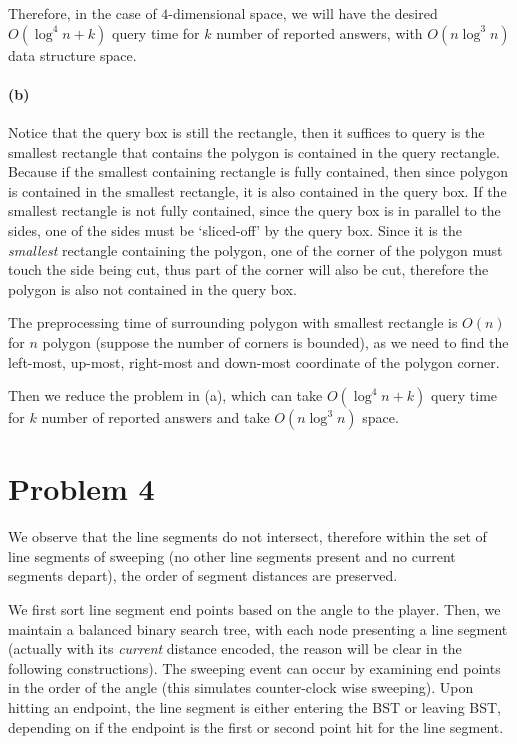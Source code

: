 \documentclass[12pt]{article}
\begin{document}
Therefore, in the case of $4$-dimensional space, we will have the desired $O(\log ^4 n + k)$ query time for $k$ number of reported answers, with $O(n \log^3 n)$ data structure space.




\paragraph{(b)} Notice that the query box is still the rectangle, then it suffices to query is the smallest rectangle that contains the polygon is contained in the query rectangle. Because if the smallest containing rectangle is fully contained, then since polygon is contained in the smallest rectangle, it is also contained in the query box. If the smallest rectangle is not fully contained, since the query box is in parallel to the sides, one of the sides must be `sliced-off' by the query box. Since it is the \emph{smallest} rectangle containing the polygon, one of the corner of the polygon must touch the side being cut, thus part of the corner will also be cut, therefore the polygon is also not contained in the query box.

The preprocessing time of surrounding polygon with smallest rectangle is $O(n)$ for $n$ polygon (suppose the number of corners is bounded), as we need to find the left-most, up-most, right-most and down-most coordinate of the polygon corner. 

Then we reduce the problem in (a), which can take $O(\log ^4 n + k)$ query time for  $k$ number of reported answers and take $O(n \log^3 n)$ space.

\pagebreak
\section*{Problem 4}
We observe that the line segments do not intersect, therefore within the set of line segments of sweeping (no other line segments present and no current segments depart), the order of segment distances are preserved. 

We first sort line segment end points based on the angle to the player. Then, we maintain a balanced binary search tree, with each node presenting a line segment (actually with its \emph{current} distance encoded, the reason will be clear in the following constructions). The sweeping event can occur by examining end points in the order of the angle (this simulates counter-clock wise sweeping). Upon hitting an endpoint, the line segment is either entering the BST or leaving BST, depending on if the endpoint is the first or second point hit for the line segment. 
\end{document}
